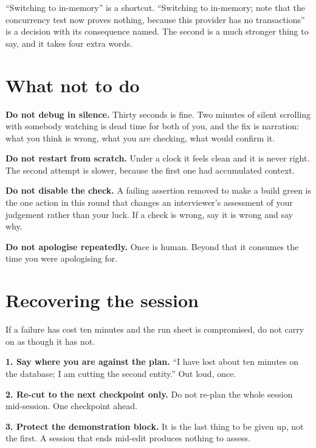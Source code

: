 \begin{kitnote}
``Switching to in-memory'' is a shortcut. ``Switching to in-memory; note that
the concurrency test now proves nothing, because this provider has no
transactions'' is a decision with its consequence named. The second is a much
stronger thing to say, and it takes four extra words.
\end{kitnote}

\section{What not to do}

\textbf{Do not debug in silence.} Thirty seconds is fine. Two minutes of
silent scrolling with somebody watching is dead time for both of you, and the
fix is narration: what you think is wrong, what you are checking, what would
confirm it.

\textbf{Do not restart from scratch.} Under a clock it feels clean and it is
never right. The second attempt is slower, because the first one had
accumulated context.

\textbf{Do not disable the check.} A failing assertion removed to make a build
green is the one action in this round that changes an interviewer's assessment
of your judgement rather than your luck. If a check is wrong, say it is wrong
and say why.

\textbf{Do not apologise repeatedly.} Once is human. Beyond that it consumes
the time you were apologising for.

\section{Recovering the session}

If a failure has cost ten minutes and the run sheet is compromised, do not
carry on as though it has not.

\begin{kitmethod}
\textbf{1. Say where you are against the plan.} ``I have lost about ten minutes
on the database; I am cutting the second entity.'' Out loud, once.

\textbf{2. Re-cut to the next checkpoint only.} Do not re-plan the whole
session mid-session. One checkpoint ahead.

\textbf{3. Protect the demonstration block.} It is the last thing to be given
up, not the first. A session that ends mid-edit produces nothing to assess.
\end{kitmethod}

